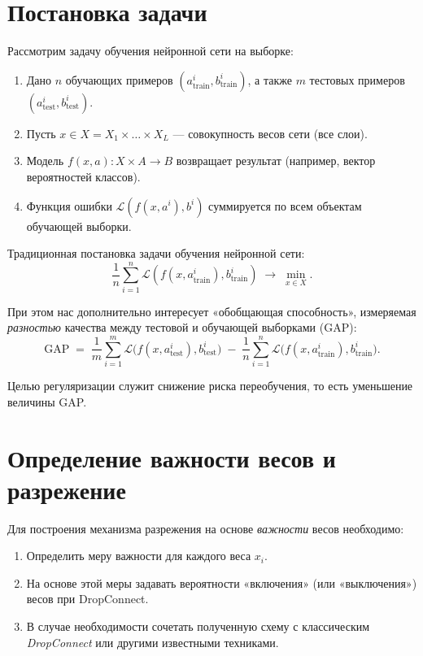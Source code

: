 \documentclass{article}
\begin{document}
\section{Постановка задачи}
\label{sec:problem}

Рассмотрим задачу обучения нейронной сети на выборке:
\begin{enumerate}
    \item Дано $n$ обучающих примеров $(a_{\text{train}}^i, b_{\text{train}}^i)$, а также $m$ тестовых примеров $(a_{\text{test}}^i, b_{\text{test}}^i)$.
    \item Пусть $x \in X = X_1 \times \dots \times X_L$ --- совокупность весов сети (все слои).
    \item Модель $f(x,a)\colon X \times A \to B$ возвращает результат (например, вектор вероятностей классов).
    \item Функция ошибки $\mathcal{L}(f(x,a^i),b^i)$ суммируется по всем объектам обучающей выборки.
\end{enumerate}

Традиционная постановка задачи обучения нейронной сети:
\begin{equation}
    \frac{1}{n} \sum_{i=1}^{n} \mathcal{L}(f(x, a_{\text{train}}^i), b_{\text{train}}^i) \;\to\; \min_{x \in X}.
\end{equation}

При этом нас дополнительно интересует «обобщающая способность», измеряемая \textit{разностью} качества между тестовой и обучающей выборками (GAP):
\begin{equation}
    \text{GAP} \;=\; \frac{1}{m} \sum_{i=1}^{m} \mathcal{L}\bigl(f(x, a_{\text{test}}^i), b_{\text{test}}^i\bigr)
    \;-\;
    \frac{1}{n} \sum_{i=1}^{n} \mathcal{L}\bigl(f(x, a_{\text{train}}^i), b_{\text{train}}^i\bigr).
\end{equation}

Целью регуляризации служит снижение риска переобучения, то есть уменьшение величины GAP.

\section{Определение важности весов и разрежение}
\label{sec:importance}

Для построения механизма разрежения на основе \textit{важности} весов необходимо:
\begin{enumerate}
    \item Определить меру важности для каждого веса $x_i$.
    \item На основе этой меры задавать вероятности «включения» (или «выключения») весов при DropConnect.
    \item В случае необходимости сочетать полученную схему с классическим \textit{DropConnect} или другими известными техниками.
\end{enumerate}
\end{document}

